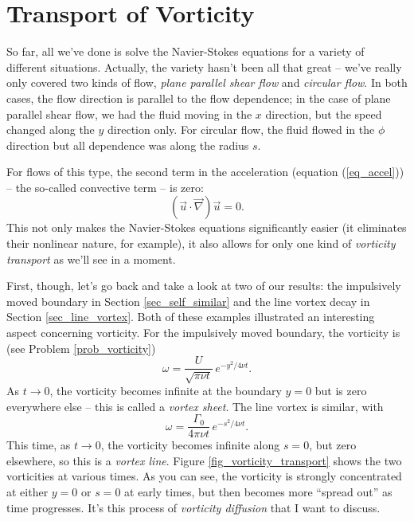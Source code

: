 %
% 

\section{Transport of Vorticity}

So far, all we've done is solve the Navier-Stokes equations for a variety of different situations.  Actually, the variety hasn't been all that great -- we've really only covered two kinds of flow, \emph{plane parallel shear flow} and \emph{circular flow}.  In both cases, the flow direction is parallel to the flow dependence; in the case of plane parallel shear flow, we had the fluid moving in the $x$ direction, but the speed changed along the $y$ direction only.  For circular flow, the fluid flowed in the $\phi$ direction but all dependence was along the radius $s$.  

For flows of this type, the second term in the acceleration (equation (\ref{eq_accel})) -- the so-called convective term -- is zero:
\[
(\vec{u} \cdot \vec{\nabla}) \vec{u} = 0.
\]
This not only makes the Navier-Stokes equations significantly easier (it eliminates their nonlinear nature, for example), it also allows for only one kind of \emph{vorticity transport} as we'll see in a moment.

First, though, let's go back and take a look at two of our results:  the impulsively moved boundary in Section \ref{sec_self_similar} and the line vortex decay in Section \ref{sec_line_vortex}.  Both of these examples illustrated an interesting aspect concerning vorticity.  For the impulsively moved boundary, the vorticity is (see Problem \ref{prob_vorticity})
\begin{equation}
\label{eq_vort_1}
\omega = \frac{U}{\sqrt{\pi \nu t}} \, e^{-y^2 / 4 \nu t}.
\end{equation}
As $t \to 0$, the vorticity becomes infinite at the boundary $y=0$ but is zero everywhere else -- this is called a \emph{vortex sheet}.  The line vortex is similar, with 
\begin{equation}
\label{eq_vort_2}
\omega = \frac{\Gamma_0}{4\pi \nu t} \, e^{-s^2 / 4 \nu t}.
\end{equation}
This time, as $t \to 0$, the vorticity becomes infinite along $s=0$, but zero elsewhere, so this is a \emph{vortex line}.  Figure \ref{fig_vorticity_transport} shows the two vorticities at various times.  As you can see, the vorticity is strongly concentrated at either $y=0$ or $s=0$ at early times, but then becomes more ``spread out'' as time progresses.  It's this process of \emph{vorticity diffusion} that I want to discuss.

